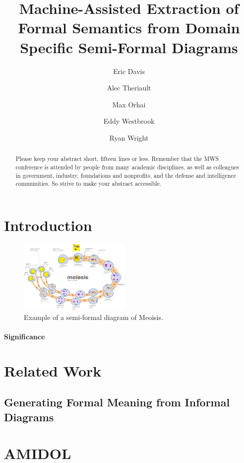 \documentclass[11pt]{article}
\date{\vspace{-5ex}}
\author[1]{Eric Davis}
\author[1]{Alec Theriault}
\author[1]{Max Orhai}
\author[1]{Eddy Westbrook}
\author[1]{Ryan Wright}
\affil[1]{Galois, Inc}
\title{Machine-Assisted Extraction of Formal Semantics from Domain Specific Semi-Formal Diagrams}
\begin{document}
\maketitle
\vspace{10pt}
\begin{abstract}
Please keep your abstract short, fifteen lines or less.  Remember that the MWS conference is attended by people from many academic disciplines, as well as colleagues in government, industry, foundations and nonprofits, and the defense and intelligence communities.  So strive to make your abstract accessible.
\end{abstract}

\section{Introduction}

\begin{figure}
\includegraphics[width=0.48\textwidth]{figs/Diagram_of_meiosis.pdf}
\caption{Example of a semi-formal diagram of Meoisis.\protect\footnotemark}
\label{Fig:Meiosis}
\end{figure}


\paragraph{Significance}

\section{Related Work}

\subsection{Generating Formal Meaning from Informal Diagrams}

\section{AMIDOL}
\end{document}
